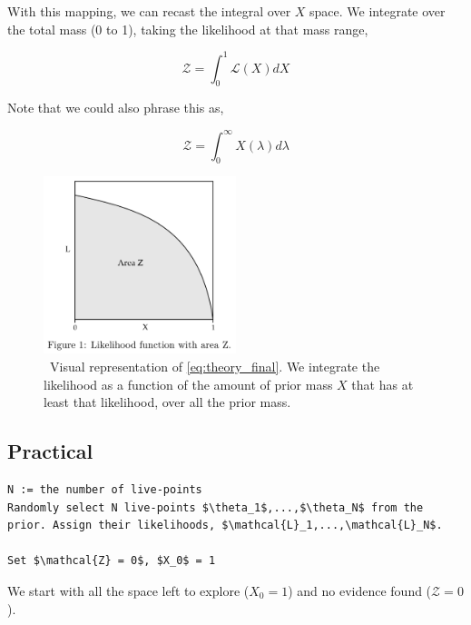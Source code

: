 \documentclass[useAMS,usenatbib,onecolumn]{mnras}
\begin{document}
With this mapping, we can recast the integral over $X$ space. We integrate over the total mass (0 to 1), taking the likelihood at that mass range,

\begin{equation}
    \mathcal{Z} = \int_0^1 \mathcal{L}(X) dX
    \label{eq:theory_final}
\end{equation}

Note that we could also phrase this as,

\begin{equation}
    \mathcal{Z} = \int_0^\infty X(\lambda) d\lambda
\end{equation}


\begin{figure}
     \begin{center}
     \includegraphics[width=0.5\textwidth]{plots/skilling2006_fig1.png}
     \caption{\
         Visual representation of \autoref{eq:theory_final}. We integrate the likelihood as a function of the amount of prior mass $X$ that has at least that likelihood, over all the prior mass.
     }
     \end{center}
\end{figure}

\subsection{Practical}

\begin{lstlisting}
N := the number of live-points
Randomly select N live-points $\theta_1$,...,$\theta_N$ from the prior. Assign their likelihoods, $\mathcal{L}_1,...,\mathcal{L}_N$.

Set $\mathcal{Z} = 0$, $X_0$ = 1
\end{lstlisting}

We start with all the space left to explore ($X_0 = 1$) and no evidence found ($\mathcal{Z} = 0$).
\end{document}

